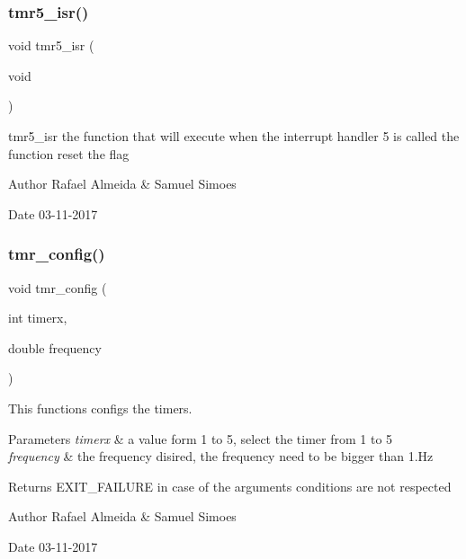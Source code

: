 \subsubsection{tmr5\+\_\+isr()}
{\footnotesize\ttfamily void tmr5\+\_\+isr (\begin{DoxyParamCaption}\item[{void}]{ }\end{DoxyParamCaption})}



tmr5\+\_\+isr the function that will execute when the interrupt handler 5 is called the function reset the flag 

\begin{DoxyAuthor}{Author}
Rafael Almeida \& Samuel Simoes 
\end{DoxyAuthor}
\begin{DoxyDate}{Date}
03-\/11-\/2017 
\end{DoxyDate}
\mbox{\label{_timer__libs_8c_a024ce1fdffe7ce7f215ed2aea77c01c6}} 
\subsubsection{tmr\+\_\+config()}
{\footnotesize\ttfamily void tmr\+\_\+config (\begin{DoxyParamCaption}\item[{int}]{timerx,  }\item[{double}]{frequency }\end{DoxyParamCaption})}



This functions configs the timer\textquotesingle{}s. 


\begin{DoxyParams}{Parameters}
{\em timerx} & a value form 1 to 5, select the timer from 1 to 5 \\
\hline
{\em frequency} & the frequency disired, the frequency need to be bigger than 1.\+Hz\\
\hline
\end{DoxyParams}
\begin{DoxyReturn}{Returns}
E\+X\+I\+T\+\_\+\+F\+A\+I\+L\+U\+RE in case of the argument\textquotesingle{}s conditions are not respected 
\end{DoxyReturn}
\begin{DoxyAuthor}{Author}
Rafael Almeida \& Samuel Simoes 
\end{DoxyAuthor}
\begin{DoxyDate}{Date}
03-\/11-\/2017 
\end{DoxyDate}
\mbox{\label{_timer__libs_8c_acf42c44ac046a888c4a5c615adfd32c8}} 
